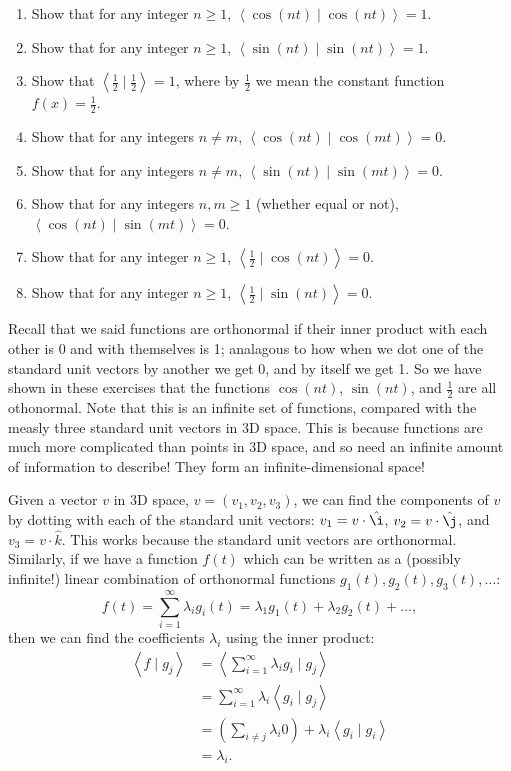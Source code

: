 \documentclass{article}
\newcommand{\ihat}{\hat\i}
\newcommand{\jhat}{\hat\j}
\newcommand{\khat}{\hat{k}}
\newcommand{\braket}[2]{\left\langle #1 \mid #2 \right\rangle}
\begin{document}
\begin{enumerate}
	\item Show that for any integer $n\geq 1$, $\braket{\cos(nt)}{\cos(nt)}=1$.
	\item Show that for any integer $n\geq 1$, $\braket{\sin(nt)}{\sin(nt)}=1$.
	\item Show that $\braket{\frac{1}{2}}{\frac{1}{2}}=1$, where by $\frac{1}{2}$ we mean the constant function $f(x)=\frac{1}{2}$.
	\item Show that for any integers $n\neq m$, $\braket{\cos(nt)}{\cos(mt)}=0$.
	\item Show that for any integers $n\neq m$, $\braket{\sin(nt)}{\sin(mt)}=0$.
	\item Show that for any integers $n,m\geq 1$ (whether equal or not), $\braket{\cos(nt)}{\sin(mt)}=0$.
	\item Show that for any integer $n\geq 1$, $\braket{\frac{1}{2}}{\cos(nt)}=0$.
	\item Show that for any integer $n\geq 1$, $\braket{\frac{1}{2}}{\sin(nt)}=0$.
\end{enumerate}

Recall that we said functions are orthonormal if their inner product with each other is 0 and with themselves is 1; analagous to how when we dot one of the standard unit vectors by another we get 0, and by itself we get 1. So we have shown in these exercises that the functions $\cos(nt)$, $\sin(nt)$, and $\frac{1}{2}$ are all othonormal. Note that this is an infinite set of functions, compared with the measly three standard unit vectors in 3D space. This is because functions are much more complicated than points in 3D space, and so need an infinite amount of information to describe! They form an infinite-dimensional space!


\clearpage


Given a vector $v$ in 3D space, $v=(v_1,v_2,v_3)$, we can find the components of $v$ by dotting with each of the standard unit vectors: $v_1=v\cdot \ihat$, $v_2=v\cdot \jhat$, and $v_3=v\cdot \khat$. This works because the standard unit vectors are orthonormal. Similarly, if we have a function $f(t)$ which can be written as a (possibly infinite!) linear combination of orthonormal functions $g_1(t),g_2(t),g_3(t),\hdots$:
\[f(t)=\sum_{i=1}^\infty \lambda_i g_i(t) = \lambda_1 g_1(t)+\lambda_2 g_2(t)+\hdots,\]
then we can find the coefficients $\lambda_i$ using the inner product:
\begin{align*}
	\braket{f}{g_j}&=\braket{\sum_{i=1}^\infty \lambda_i g_i}{g_j}\\
	&=\sum_{i=1}^\infty \lambda_i\braket{g_i}{g_j}\\
	&=\left(\sum_{i\neq j} \lambda_i 0\right)+\lambda_i\braket{g_i}{g_i}\\
	&=\lambda_i.
\end{align*}
\end{document}
